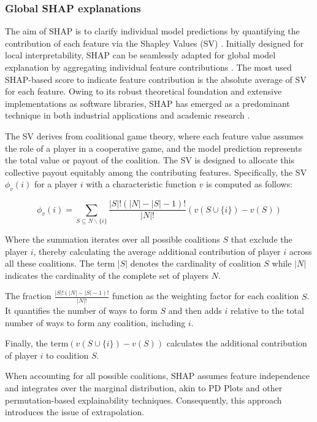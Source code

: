 \subsubsection{Global SHAP explanations}
\label{chap2_shap}

The aim of SHAP is to clarify individual model predictions by quantifying the contribution of each feature via the Shapley Values (SV) \cite{Shapley1953AGames}. Initially designed for local interpretability, SHAP can be seamlessly adapted for global model explanation by aggregating individual feature contributions \cite{Lundberg2020FromTrees.}. The most used SHAP-based score to indicate feature contribution is the absolute average of SV for each feature. Owing to its robust theoretical foundation and extensive implementations as software libraries, SHAP has emerged as a predominant technique in both industrial applications and academic research \cite{Bhatt2020ExplainableDeployment}.

The SV derives from coalitional game theory, where each feature value assumes the role of a player in a cooperative game, and the model prediction represents the total value or payout of the coalition. The SV is designed to allocate this collective payout equitably among the contributing features. Specifically, the SV $\phi_v(i)$ for a player $i$ with a characteristic function $v$ is computed as follows: 

\begin{equation}
\phi_v(i) = \sum_{S \subseteq N \backslash \{i\}} \frac{|S|! \left( |N| - |S| - 1 \right)!}{|N|!} \left( v\left( S \cup \{i\} \right) - v(S) \right)
\end{equation}

Where the summation iterates over all possible coalitions $S$ that exclude the player \(i\), thereby calculating the average additional contribution of player $i$ across all these coalitions. The term $|S|$ denotes the cardinality of coalition $S$ while $|N|$ indicates the cardinality of the complete set of players $N$. 

The fraction $\frac{|S|! \left( |N| - |S| - 1 \right)!}{|N|!}$ function as the weighting factor for each coalition $S$. It quantifies the number of ways to form $S$ and then adds $i$ relative to the total number of ways to form any coalition, including $i$. 

Finally,  the term$\left( v\left( S \cup \{i\} \right) - v(S) \right)$ calculates the additional contribution of player $i$ to coalition $S$. 

When accounting for all possible coalitions, SHAP assumes feature independence and integrates over the marginal distribution, akin to PD Plots and other permutation-based explainability techniques. Consequently, this approach introduces the issue of extrapolation.

